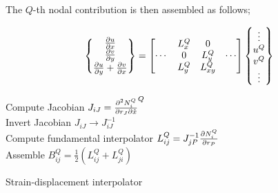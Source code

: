 The $Q$-th nodal contribution is then assembled as follows;


\begin{equation}
\begin{Bmatrix}
\pdv{u}{x}\\
\pdv{v}{y}\\
\pdv{u}{y} + \pdv{v}{x}
\end{Bmatrix} =
\begin{bmatrix}
 &L_x^Q &0 \\
\cdots &0 &L_y^Q &\cdots\\
 &L_y^Q &L_{xy}^Q
\end{bmatrix}
\begin{Bmatrix}
\vdots\\
u^Q\\
v^Q\\
\vdots
\end{Bmatrix}
\label{eq:strain inter}
\end{equation}

\begin{algorithm}[H]
\SetAlgoLined
{}
Compute Jacobian ${J_{iJ}} = \pdv{N_i^Q}{r_J}{\hat x}^Q$\\
Invert Jacobian  ${J_{iJ}} \to J_{iJ}^{ - 1}$\\
Compute fundamental interpolator $L_{ij}^Q = J_{jP}^{ - 1}\pdv{N_i^Q}{r_P}$\\
Assemble $B_{ij}^Q = \frac{1}{2}\left( {L_{ij}^Q + L_{ji}^Q} \right)$ 
\caption{Strain-displacement interpolator}
\end{algorithm}



